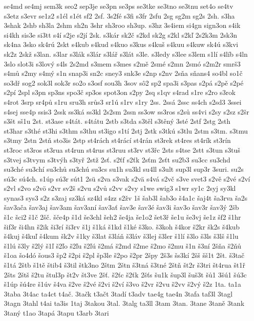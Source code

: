 {se4md
se4mj
sem3k
seo2
sep3je
se3pn
se3ps
se3tke
se3tno
se3tnu
set4o
se4tv
s3etz
s3evr
se1z2
s1él
s1ét
sf2
2sf.
3s2fé
s3fi
s3fr
2sfu
2sg
sg2m
sg2s
2sh.
s3ha
3shak
2shb
sh3la
2shm
sh2n
3shr
sh3roo
sh3up.
s3hz
3s4iem
si4gn
sign3on
s4ik
si4kh
sis3e
si3tt
s4í
s2je
s2jí
2sk.
s3kár
sk2č
s2kd
sk2g
s2kl
s2kľ
2s2k3m
2sk3n
sk4na
3sko
sk4rú
2skt
s4kub
s4kud
s4kuo
s3kus
s4kuš
s4kuu
s4kuw
sk4ú
s3kvi
sk2z
2skž
s3lan.
s3lar
s3lák
s3lár
s3lář
s3lát
s3le.
s3ledy
s3lee
s3lem
s1lí
s4líb
s4ln
3slo
slot3i
s3lový
s4ls
2s2md
s3mem
s3mes
s2mě
2smé
s2mn
2smó
s2m2r
smrš3
s4mů
s2my
s4mý
s1n
snap3i
sn2c
sney3
snk3e
s2np
s2nv
2sňa
sňans4
so4bl
so1č
so3dř
sog2
sok3l
sok3r
so2o
s3osf
sou3h
3sov
sô2
sp2
spa3i
s3pas
s2pá
s2pě
s2pé
s2pí
2spl
s3pn
sp3ns
spo3č
sp3os
spot3on
s2py
2sq
s1qv
s4rad
s1re
s2ro
s3rok
s4rot
3srp
sr4pů
s1ru
sru3h
srůs3
sr1ú
s1rv
s1ry
2ss.
2ssá
2ssc
ss4ch
s2sd3
3ssei
s4sej
sse4p
ssis3
2ssk
ss3ká
ss3kl
2s2sm
2ssn
ss3ow
ss3ros
s2sů
ss4vi
s2sy
s2sz
s2šr
s3št
sš1u
2st.
st3ase
s4tát.
s4tátu
2stb
s3tda
s3těl
s3těný
3sté
2stf
2stg
2sth
st3har
s3thé
st3hi
s3thm
s3thu
st3igo
s1tí
2stj
2stk
s3tkú
s3tlu
2stm
s3tm.
s3tmu
s3tmy
2stn
2stň
sto3is
2stp
st4rách
st4rácí
st4rán
st3rek
st4res
st4rík
st3rín
st3roc
st3ros
st3rua
st4run
st4rus
st3ruu
st3rv
st3řc
2sts
s4tse
2stt
s3tun
s3tuš
s3tvej
s3tvym
s3tvýh
s3tyř
2stž
2sť.
s2ťf
s2ťk
2sťm
2sťt
su2b3
su3cc
su3chd
su3ché
su3chí
su3chů
su3chú
su3cs
su1h
su3kl
su4ll
s3ult
sup3l
sup3r
3suri.
su2s
sú3c
sú4ch.
s1úp
sú3r
sút1
2sü
s2va
s3vak
s2vä
s4vá
s2vč
s3ve
svet3
s2vě
s2vé
s2ví
s2vl
s2vo
s2vö
s2vr
sv2š
s2vu
s2vů
s2vv
s2vy
s1we
swig3
s1wr
sy1c
2syj
sy3kl
synas3
sys3
s2z
s3zaj
sz3ká
sz4kl
s4zz
s2žv
1š
šab3l
šab3o
š4a1c
šaj4t
ša3rva
ša2s
šav3ača
šav3aj
šav3am
šav3aní
šav3ať
šav3e
šav3é
šav3i
šav3o
šav3r
šav3ý
2šb
š1c
šci2
š1č
2šč.
šče4p
š1d
še3chl
šeh2
še4ja
še1o2
šet3ř
še1u
še3vj
še1z
šf2
š1hr
šif3r
ši4hn
š2ik
ši3rí
ši3rv
š1j
š1ká
š1kd
š1ké
š3ko.
š3koh
š4kor
š2kr
šk2s
š4kub
š4kuj
š4kuľ
š4kum
šk2v
š1ky
š3lat
š3láň
š3láv
š3lej
š3ler
š1lí
š3lo
š3ls
š3lš
š1lu
š1lú
š3ly
š2lý
š1ľ
š2ľo
š2ľu
š2ľú
š2má
š2md
š2me
š2mo
š2mu
š1n
š3ní
2šňa
š2ňů
š1oa
šo4dó
šous3
šp2
š2pi
š2pl
šp3le
š2po
š2pr
2špy
2š3s
šs3kí
2šš
šš1t
2št.
š3tač
š1tá
2štb
š1tě
štib4
š3til
štk3no
2štm
2štn
š3tná
š3tné
2štň
št2r
š3tri
št4rua
št1ř
2šts
2štš
š2tu
štul3p
št2v
št3ve
2šť.
š2ťc
š2ťk
2šťs
šu1k
šup3l
šuš3t
šů1
3šú1
šú3c
š1úp
šú4re
š1úv
š4va
š2ve
š2vé
š2vi
š2ví
š3vo
š2vr
š2vu
š2vv
š2vý
š2z
1ta.
ta1a
3taba
3t4ac
ta4ct
t4ač.
3tačk
t3ačt
3tadí
t3adv
tae4g
tae4n
3tafa
taf3l
3tagl
3tagn
3tahl
t4ai
ta3is
1taj
3takou
3tal.
3talg
ta3ll
3tam
3tan.
3tane
3taně
3tank
3taný
t1ao
3tapá
3tapu
t3arb
3tari
}
